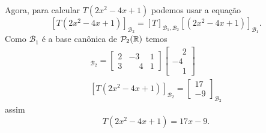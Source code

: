 \begin{exemplos}
\begin{enumerate}[label={\arabic*})]
\begin{solucao}
            Agora, para calcular $T(2x^2 - 4x + 1)$ podemos usar a equação
            \[
                [T(2x^2 - 4x + 1)]_{\mathcal{B}_2} = [T]_{\mathcal{B}_1, \mathcal{B}_2}[(2x^2 - 4x + 1)]_{\mathcal{B}_1}.
            \]
            Como $\mathcal{B}_1$ é a base canônica de $\mathcal{P}_2(\mathbb{R})$ temos
            \begin{align*}
                [T(2x^2 - 4x + 1)]_{\mathcal{B}_2} = \begin{bmatrix}2 & -3 & 1\\3 & \phantom{-}4 & 1\end{bmatrix}\begin{bmatrix}\phantom{-}2 \\ -4\\\phantom{-}1\end{bmatrix}\\
                [T(2x^2 - 4x + 1)]_{\mathcal{B}_2} = \begin{bmatrix}17 \\ -9\end{bmatrix}_{\mathcal{B}_2}
            \end{align*}
            assim
            \[
                T(2x^2 - 4x + 1) = 17x - 9.
            \]
        \end{solucao}


\end{enumerate}
\end{exemplos}
